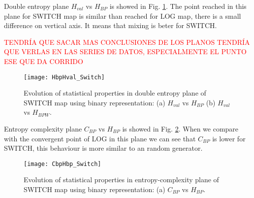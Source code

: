 Double entropy plane $H_{val}$ vs $H_{BP}$ is showed in Fig. \ref{fig:SWITCH_HH}.
The point reached in this plane for SWITCH map is similar than reached for LOG map, there is a small difference on vertical axis.
It means that mixing is beter for SWITCH.

\textcolor{red}{TENDRÍA QUE SACAR MAS CONCLUSIONES DE LOS PLANOS TENDRÍA QUE VERLAS EN LAS SERIES DE DATOS, ESPECIALMENTE EL PUNTO ESE QUE DA CORRIDO}

\begin{figure}
	\texttt{[image: HbpHval\_Switch]}
	\caption{Evolution of statistical properties in double entropy plane of SWITCH map using binary representation: (a) $H_{val}$ vs $H_{BP}$ (b) $H_{val}$ vs $H_{BPW}$.}
	\label{fig:SWITCH_HH}
\end{figure}

Entropy complexity plane $C_{BP}$ vs $H_{BP}$ is showed in Fig. \ref{fig:SWITCH_HC}.
When we compare with the convergent point of LOG in this plane we can see that $C_{BP}$ is lower for SWITCH, this behaviour is more similar to an random generator.

\begin{figure}
	\texttt{[image: CbpHbp\_Switch]}
	\caption{Evolution of statistical properties in entropy-complexity plane of SWITCH map using binary representation: (a) $C_{BP}$ vs $H_{BP}$.}
	\label{fig:SWITCH_HC}
\end{figure}
